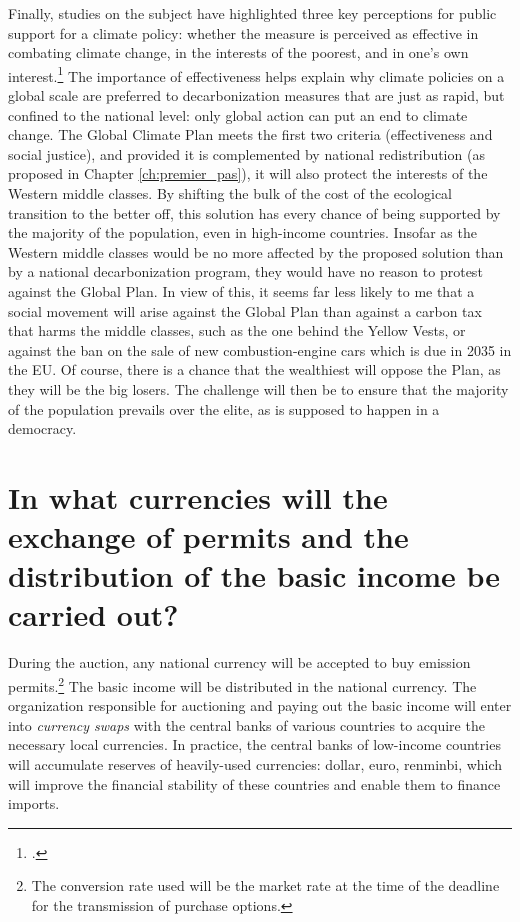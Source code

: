 \documentclass[a5paper,english,openany]{memoir}
\begin{document}
Finally, studies on the subject have highlighted three key perceptions for public support for a climate policy: whether the measure is perceived as %
effective in combating %
climate change, in the interests of the poorest, and in one's own interest.\footnote{\citet{dechezlepretre_fighting_2022}.} The importance of effectiveness helps explain why climate policies on a global scale are preferred to decarbonization %
measures that are just as rapid, but confined to the national level: only global action can put an end to climate change. The Global Climate Plan meets the first two criteria (effectiveness and social justice), and provided it is complemented by national redistribution (as proposed in Chapter \ref{ch:premier_pas}), it will also protect the interests of the Western middle classes. By shifting the bulk of the cost of the ecological transition %
to the better off, %
this solution has every chance of being supported by the majority of the population, even in high-income countries. Insofar as the Western middle classes would be no more affected by the proposed solution than by a national decarbonization %
program, they would have no reason to protest against the Global Plan. In view of this, it seems far less likely to me that a social movement will arise against the Global Plan than against a carbon tax that harms the middle classes, such as the one behind the Yellow Vests, %
or against the ban on the sale of new combustion-engine cars which is due in 2035 in the EU. %
Of course, there is a chance that the wealthiest will oppose the Plan, as they will be the big losers. The challenge will then be to ensure that the majority of the population prevails over the elite, as is supposed to happen in a democracy.


\section*{\normalsize In what currencies will the exchange of permits and the distribution of the basic income be carried out?\label{q:devise}} %

During the auction, any national currency will be accepted to buy emission permits.\footnote{The conversion rate used will be the market rate at the time of the deadline for the transmission of purchase options.} The basic income will be distributed in the national currency. The organization %
responsible for auctioning and paying out the basic income will enter into \textit{currency swaps} with the central banks of various countries to acquire the necessary local currencies. In practice, the central banks of low-income countries will accumulate reserves of heavily-used currencies: dollar, euro, renminbi, %
which will improve the financial stability of these countries and enable them to finance imports.
\end{document}

